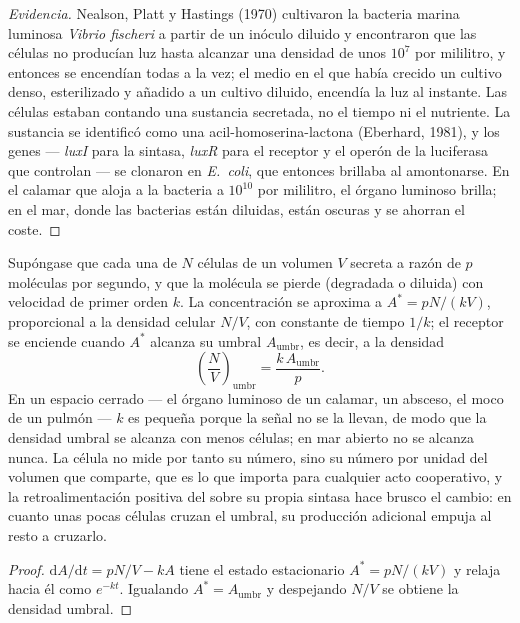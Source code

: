\begin{proof}[Evidencia]
Nealson, Platt y Hastings (1970) cultivaron la bacteria marina luminosa
\emph{Vibrio fischeri} a partir de un inóculo diluido y encontraron que
las células no producían luz hasta alcanzar una densidad de unos $10^{7}$
por mililitro, y entonces se encendían todas a la vez; el medio en el que
había crecido un cultivo denso, esterilizado y añadido a un cultivo
diluido, encendía la luz al instante. Las células estaban contando una
sustancia secretada, no el tiempo ni el nutriente. La sustancia se
identificó como una acil-homoserina-lactona (Eberhard, 1981), y los genes
--- \emph{luxI} para la sintasa, \emph{luxR} para el receptor y el operón
de la luciferasa que controlan --- se clonaron en \emph{E.~coli}, que
entonces brillaba al amontonarse. En el calamar que aloja a la bacteria a
$10^{10}$ por mililitro, el órgano luminoso brilla; en el mar, donde las
bacterias están diluidas, están oscuras y se ahorran el coste.
\end{proof}

\begin{proposition}\label{prop:b3:bacteriology:threshold}
Supóngase que cada una de $N$ células de un volumen $V$ secreta
 a razón de $p$ moléculas por segundo, y que la molécula se
pierde (degradada o diluida) con velocidad de primer orden $k$. La
concentración se aproxima a $A^{*} = pN/(kV)$, proporcional a la
densidad celular $N/V$, con constante de tiempo $1/k$; el receptor se enciende
cuando $A^{*}$ alcanza su umbral $A_{\text{umbr}}$, es decir, a la
densidad
\[
\left(\frac{N}{V}\right)_{\text{umbr}} = \frac{k\,A_{\text{umbr}}}{p}.
\]
En un espacio cerrado --- el órgano luminoso de un calamar, un absceso,
el moco de un pulmón --- $k$ es pequeña porque la señal no se la llevan,
de modo que la densidad umbral se alcanza con menos células; en mar
abierto no se alcanza nunca. La célula no mide por tanto su número, sino
su número por unidad del volumen que comparte, que es lo que importa para
cualquier acto cooperativo, y la retroalimentación positiva del
 sobre su propia sintasa hace brusco el cambio: en cuanto
unas pocas células cruzan el umbral, su producción adicional empuja al
resto a cruzarlo.
\end{proposition}
\begin{proof}
$\mathrm{d}A/\mathrm{d}t = pN/V - kA$ tiene el estado estacionario $A^{*} =
pN/(kV)$ y relaja hacia él como $e^{-kt}$. Igualando
$A^{*} = A_{\text{umbr}}$ y despejando $N/V$ se obtiene la densidad
umbral.
\end{proof}

